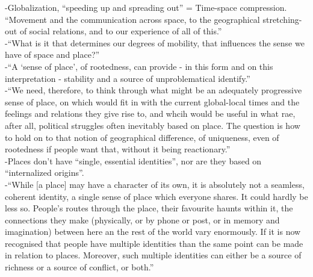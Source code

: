 -{\color{orange}Globalization, “speeding up and spreading out” = Time-space compression. “Movement and the communication across space, to the geographical stretching-out of social relations, and to our experience of all of this.”}\cite{MasseyD1991}\\
-{\color{orange}“What is it that determines our degrees of mobility, that influences the sense we have of space and place?”}\cite{MasseyD1991}\\
-{\color{orange}“A ‘sense of place’, of rootedness, can provide - in this form and on this interpretation - stability and a source of unproblematical identify.”}\cite{MasseyD1991}\\
-{\color{orange}“We need, therefore, to think through what might be an adequately progressive sense of place, on which would fit in with the current global-local times and the feelings and relations they give rise to, and whcih would be useful in what rae, after all, political struggles often inevitably based on place. The question is how to hold on to that notion of geographical difference, of uniqueness, even of rootedness if people want that, without it being reactionary.”}\cite{MasseyD1991}\\
-{\color{orange}Places don’t have “single, essential identities”, nor are they based on “internalized origins”.}\cite{MasseyD1991}\\
-{\color{orange}“While [a place] may have a character of its own, it is absolutely not a seamless, coherent identity, a single sense of place which everyone shares. It could hardly be less so. People’s routes through the place, their favourite haunts within it, the connections they make (physically, or by phone or post, or in memory and imagination) between here an the rest of the world vary enormously. If it is now recognised that people have multiple identities than the same point can be made in relation to places. Moreover, such multiple identities can either be a source of richness or a source of conflict, or both.”}\cite{MasseyD1991}\\
